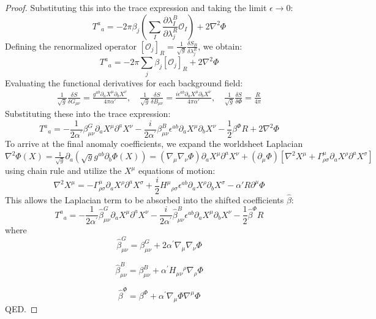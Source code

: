 \begin{tcolorbox}[breakable]
\begin{proof}
		Substituting this into the trace expression and taking the limit $\epsilon \to 0$:
		\begin{equation}
			T^a{}_a = -2\pi \beta_j \left( \sum_I \frac{\partial \lambda_I^B}{\partial \lambda_j^R} \mathcal{O}_I \right) + 2 \nabla^2 \Phi
		\end{equation}
		Defining the renormalized operator $[\mathcal{O}_j]_R = \frac{1}{\sqrt{g}} \frac{\delta S_B}{\delta \lambda_j^R}$, we obtain:
		\begin{equation}
			\boxed{T^a{}_a = -2\pi \sum_j \beta_j [\mathcal{O}_j]_R + 2 \nabla^2 \Phi}
		\end{equation}	
		Evaluating the functional derivatives for each background field:
		\begin{align}
			\frac{1}{\sqrt{g}} \frac{\delta S}{\delta G_{\mu\nu}} = \frac{g^{ab} \partial_a X^\mu \partial_b X^\nu}{4\pi\alpha'}, \quad 
			\frac{1}{\sqrt{g}} \frac{\delta S}{\delta B_{\mu\nu}} = \frac{i \epsilon^{ab} \partial_a X^\mu \partial_b X^\nu}{4\pi\alpha'}, \quad
			\frac{1}{\sqrt{g}} \frac{\delta S}{\delta \Phi} = \frac{R}{4\pi}
		\end{align}
		Substituting these into the trace expression:
		\begin{equation}
			T^a{}_a = -\frac{1}{2 \alpha^{\prime}} \beta_{\mu \nu}^{G} \partial_{a} X^{\mu} \partial^{a} X^{\nu}-\frac{i}{2 \alpha^{\prime}} \beta_{\mu \nu}^{B} \epsilon^{a b} \partial_{a} X^{\mu} \partial_{b} X^{\nu}-\frac{1}{2} \beta^{\Phi} R + 2 \nabla^2 \Phi
		\end{equation}
		To arrive at the final anomaly coefficients, we expand the worldsheet Laplacian $\nabla^2 \Phi(X) = \frac{1}{\sqrt{g}} \partial_a \left( \sqrt{g} g^{ab} \partial_b \Phi(X) \right)= (\nabla_\mu \nabla_\nu \Phi) \partial_a X^\mu \partial^a X^\nu + (\partial_\mu \Phi) [\nabla^2 X^\mu+\Gamma^\mu_{\rho\sigma} \partial_a X^\rho \partial^a X^\sigma]$ using chain rule and utilize the $X^\mu$ equations of motion:
		\begin{equation}
			\nabla^2 X^\mu = -\Gamma^\mu_{\rho\sigma} \partial_a X^\rho \partial^a X^\sigma + \frac{i}{2} H^\mu{}_{\rho\sigma} \epsilon^{ab} \partial_a X^\rho \partial_b X^\sigma - \alpha' R \partial^\mu \Phi
		\end{equation}
		This allows the Laplacian term to be absorbed into the shifted coefficients $\hat{\beta}$:
		\begin{equation}
			\boxed{T^a{}_a = -\frac{1}{2 \alpha^{\prime}} \hat{\beta}_{\mu \nu}^{G} \partial_{a} X^{\mu} \partial^{a} X^{\nu} - \frac{i}{2 \alpha^{\prime}} \hat{\beta}_{\mu \nu}^{B} \epsilon^{a b} \partial_{a} X^{\mu} \partial_{b} X^{\nu} - \frac{1}{2} \hat{\beta}^{\Phi} R}
		\end{equation}
		where $$\hat{\beta}_{\mu \nu}^{G} = \beta_{\mu \nu}^{G} + 2 \alpha^{\prime} \nabla_{\mu} \nabla_{\nu} \Phi$$
		
		$$\hat{\beta}_{\mu \nu}^{B} = \beta_{\mu \nu}^{B} + \alpha^{\prime} H_{\mu \nu}{ }^{\rho} \nabla_{\rho} \Phi$$
		
		$$\hat{\beta}^{\Phi} = \beta^{\Phi} + \alpha^{\prime} \nabla_\mu \Phi \nabla^\mu \Phi$$
		QED.
	\end{proof}
\end{tcolorbox}
